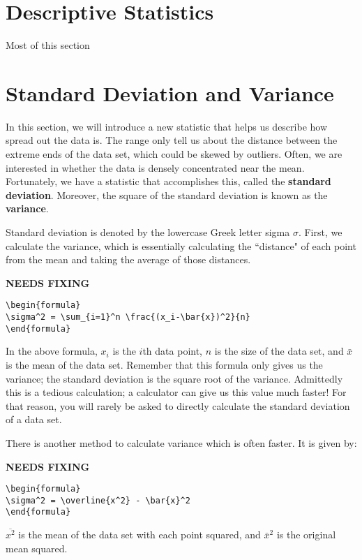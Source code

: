 \section{Descriptive Statistics}
Most of this section

\section{Standard Deviation and Variance}
In this section, we will introduce a new statistic that helps us describe how spread out the data is. The range only tell us about the distance between the extreme ends of the data set, which could be skewed by outliers. Often, we are interested in whether the data is densely concentrated near the mean. Fortunately, we have a statistic that accomplishes this, called the \textbf{standard deviation}. Moreover, the square of the standard deviation is known as the \textbf{variance}. 

Standard deviation is denoted by the lowercase Greek letter sigma $\sigma$. First, we calculate the variance, which is essentially calculating the ``distance" of each point from the mean and taking the average of those distances.

{\hfill\Large\bfseries NEEDS FIXING\hfill}
\begin{lstlisting}
\begin{formula}
\sigma^2 = \sum_{i=1}^n \frac{(x_i-\bar{x})^2}{n}
\end{formula}
 \end{lstlisting}
In the above formula, $x_i$ is the $i$th data point, $n$ is the size of the data set, and $\bar{x}$ is the mean of the data set. Remember that this formula only gives us the variance; the standard deviation is the square root of the variance. Admittedly this is a tedious calculation; a calculator can give us this value much faster! For that reason, you will rarely be asked to directly calculate the standard deviation of a data set.

There is another method to calculate variance which is often faster. It is given by:

{\hfill\Large\bfseries NEEDS FIXING\hfill}
\begin{lstlisting}
\begin{formula}
\sigma^2 = \overline{x^2} - \bar{x}^2
\end{formula}
 \end{lstlisting}

$\overline{x^2}$ is the mean of the data set with each point squared, and $\bar{x}^2$ is the original mean squared.

